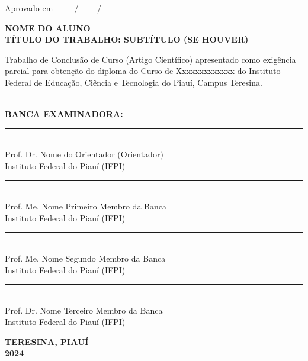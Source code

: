 \documentclass[12pt, a4paper]{article}
\begin{document}
\begin{titlepage}
    \begin{flushright}
        Aprovado em \_\_\_/\_\_\_/\_\_\_\_\_
    \end{flushright}
    
    \vspace{1cm}
    \begin{center}
        \textbf{\MakeUppercase{Nome do Aluno}} \\[1.5cm]
        \textbf{\MakeUppercase{Título do Trabalho: Subtítulo (se houver)}} \\[1.5cm]
    \end{center}
    
    \hfill
    \begin{minipage}{0.5\textwidth}
        \raggedright
        Trabalho de Conclusão de Curso (Artigo Científico) apresentado como exigência parcial para obtenção do diploma do Curso de Xxxxxxxxxxxxx do Instituto Federal de Educação, Ciência e Tecnologia do Piauí, Campus Teresina.
    \end{minipage}\\[1.5cm]
    
    \noindent\textbf{BANCA EXAMINADORA:}\\[1.5cm]
    
    \noindent\rule{12cm}{0.2mm} \\
    Prof. Dr. Nome do Orientador (Orientador)\\
    Instituto Federal do Piauí (IFPI)\\[1cm]
    
    \noindent\rule{12cm}{0.2mm} \\
    Prof. Me. Nome Primeiro Membro da Banca\\
    Instituto Federal do Piauí (IFPI)\\[1cm]
    
    \noindent\rule{12cm}{0.2mm} \\
    Prof. Me. Nome Segundo Membro da Banca\\
    Instituto Federal do Piauí (IFPI)\\[1cm]
    
    \noindent\rule{12cm}{0.2mm} \\
    Prof. Dr. Nome Terceiro Membro da Banca\\
    Instituto Federal do Piauí (IFPI)
    
    \vfill
    \begin{center}
        \textbf{\MakeUppercase{Teresina, Piauí}} \\
        \textbf{2024}
    \end{center}
\end{titlepage}
\end{document}
